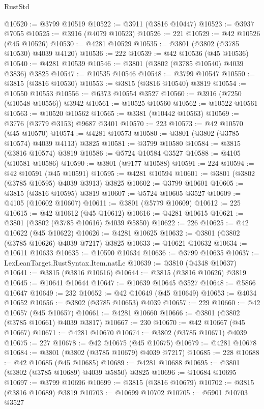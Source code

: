 \begin{lexlean}{RustStd}
\begin{coremodule}
@10520 := @3799 @10519
@10522 := @3911 (@3816 @10447)
@10523 := @3937 @7055
@10525 := @3916 (@4079 @10523)
@10526 := 221
@10529 := @42 @10526 (@45 @10526)
@10530 := @4281 @10529
@10535 := @3801 (@3802 (@3785 @10530) @4039 @4120)
@10536 := 222
@10539 := @42 @10536 (@45 @10536)
@10540 := @4281 @10539
@10546 := @3801 (@3802 (@3785 @10540) @4039 @3836) @3825
@10547 := @10535 @10546
@10548 := @3799 @10547
@10550 := @3815 (@3816 @10530)
@10553 := @3815 (@3816 @10540) @3819
@10554 := @10550 @10553
@10556 := @6373 @10554 @3527
@10560 := @3916 (@7250 (@10548 @10556)) @3942
@10561 := @10525 @10560
@10562 := @10522 @10561
@10563 := @10520 @10562
@10565 := @3381 (@10442 @10563)
@10569 := @3776 (@3779 @3153) @9687 @3401
@10570 := 223
@10573 := @42 @10570 (@45 @10570)
@10574 := @4281 @10573
@10580 := @3801 (@3802 (@3785 @10574) @4039 @4113) @3825
@10581 := @3799 @10580
@10584 := @3815 (@3816 @10574) @3819
@10586 := @5724 @10584 @3527
@10588 := @4105 (@10581 @10586)
@10590 := @3801 (@9177 @10588)
@10591 := 224
@10594 := @42 @10591 (@45 @10591)
@10595 := @4281 @10594
@10601 := @3801 (@3802 (@3785 @10595) @4039 @3913) @3825
@10602 := @3799 @10601
@10605 := @3815 (@3816 @10595) @3819
@10607 := @5724 @10605 @3527
@10609 := @4105 (@10602 @10607)
@10611 := @3801 (@5779 @10609)
@10612 := 225
@10615 := @42 @10612 (@45 @10612)
@10616 := @4281 @10615
@10621 := @3801 (@3802 (@3785 @10616) @4039 @5850)
@10622 := 226
@10625 := @42 @10622 (@45 @10622)
@10626 := @4281 @10625
@10632 := @3801 (@3802 (@3785 @10626) @4039 @7217) @3825
@10633 := @10621 @10632
@10634 := @10611 @10633
@10635 := @10590 @10634
@10636 := @3799 @10635
@10637 := LexLeanTarget.RustSyntax.Item.natLe
@10639 := @3810 (@4348 @10637)
@10641 := @3815 (@3816 @10616)
@10644 := @3815 (@3816 @10626) @3819
@10645 := @10641 @10644
@10647 := @10639 @10645 @3527
@10648 := @5866 @10647
@10649 := 232
@10652 := @42 @10649 (@45 @10649)
@10653 := @4034 @10652
@10656 := @3802 (@3785 @10653) @4039
@10657 := 229
@10660 := @42 @10657 (@45 @10657)
@10661 := @4281 @10660
@10666 := @3801 (@3802 (@3785 @10661) @4039 @3817)
@10667 := 230
@10670 := @42 @10667 (@45 @10667)
@10671 := @4281 @10670
@10674 := @3802 (@3785 @10671) @4039
@10675 := 227
@10678 := @42 @10675 (@45 @10675)
@10679 := @4281 @10678
@10684 := @3801 (@3802 (@3785 @10679) @4039 @7217)
@10685 := 228
@10688 := @42 @10685 (@45 @10685)
@10689 := @4281 @10688
@10695 := @3801 (@3802 (@3785 @10689) @4039 @5850) @3825
@10696 := @10684 @10695
@10697 := @3799 @10696
@10699 := @3815 (@3816 @10679)
@10702 := @3815 (@3816 @10689) @3819
@10703 := @10699 @10702
@10705 := @5901 @10703 @3527

\end{coremodule}
\end{lexlean}
